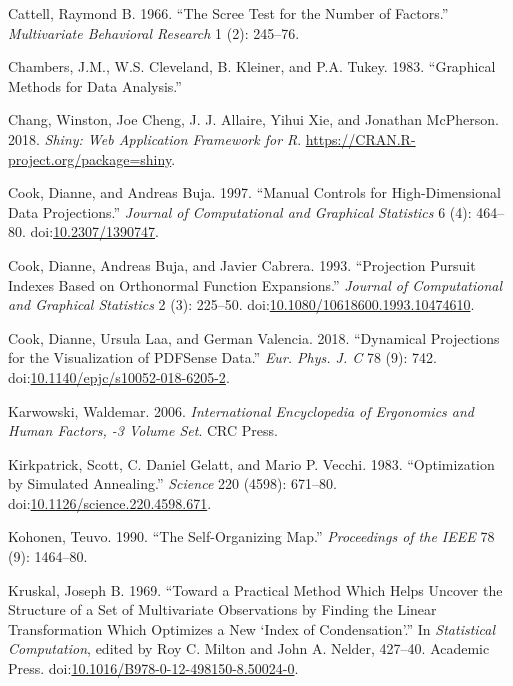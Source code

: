 \documentclass[11,]{article}
\theoremstyle{definition}
\theoremstyle{definition}
\theoremstyle{definition}
\theoremstyle{remark}
\begin{document}
\hypertarget{ref-cattell_scree_1966}{}
Cattell, Raymond B. 1966. ``The Scree Test for the Number of Factors.''
\emph{Multivariate Behavioral Research} 1 (2): 245--76.

\hypertarget{ref-chambers_graphical_1983}{}
Chambers, J.M., W.S. Cleveland, B. Kleiner, and P.A. Tukey. 1983.
``Graphical Methods for Data Analysis.''

\hypertarget{ref-chang_shiny:_2018}{}
Chang, Winston, Joe Cheng, J. J. Allaire, Yihui Xie, and Jonathan
McPherson. 2018. \emph{Shiny: Web Application Framework for R}.
\url{https://CRAN.R-project.org/package=shiny}.

\hypertarget{ref-cook_manual_1997}{}
Cook, Dianne, and Andreas Buja. 1997. ``Manual Controls for
High-Dimensional Data Projections.'' \emph{Journal of Computational and
Graphical Statistics} 6 (4): 464--80.
doi:\href{https://doi.org/10.2307/1390747}{10.2307/1390747}.

\hypertarget{ref-cook_projection_1993}{}
Cook, Dianne, Andreas Buja, and Javier Cabrera. 1993. ``Projection
Pursuit Indexes Based on Orthonormal Function Expansions.''
\emph{Journal of Computational and Graphical Statistics} 2 (3): 225--50.
doi:\href{https://doi.org/10.1080/10618600.1993.10474610}{10.1080/10618600.1993.10474610}.

\hypertarget{ref-cook_dynamical_2018}{}
Cook, Dianne, Ursula Laa, and German Valencia. 2018. ``Dynamical
Projections for the Visualization of PDFSense Data.'' \emph{Eur. Phys.
J. C} 78 (9): 742.
doi:\href{https://doi.org/10.1140/epjc/s10052-018-6205-2}{10.1140/epjc/s10052-018-6205-2}.

\hypertarget{ref-karwowski_international_2006}{}
Karwowski, Waldemar. 2006. \emph{International Encyclopedia of
Ergonomics and Human Factors, -3 Volume Set}. CRC Press.

\hypertarget{ref-kirkpatrick_optimization_1983}{}
Kirkpatrick, Scott, C. Daniel Gelatt, and Mario P. Vecchi. 1983.
``Optimization by Simulated Annealing.'' \emph{Science} 220 (4598):
671--80.
doi:\href{https://doi.org/10.1126/science.220.4598.671}{10.1126/science.220.4598.671}.

\hypertarget{ref-kohonen_self-organizing_1990}{}
Kohonen, Teuvo. 1990. ``The Self-Organizing Map.'' \emph{Proceedings of
the IEEE} 78 (9): 1464--80.

\hypertarget{ref-kruskal_toward_1969}{}
Kruskal, Joseph B. 1969. ``Toward a Practical Method Which Helps Uncover
the Structure of a Set of Multivariate Observations by Finding the
Linear Transformation Which Optimizes a New `Index of Condensation'.''
In \emph{Statistical Computation}, edited by Roy C. Milton and John A.
Nelder, 427--40. Academic Press.
doi:\href{https://doi.org/10.1016/B978-0-12-498150-8.50024-0}{10.1016/B978-0-12-498150-8.50024-0}.
\end{document}
